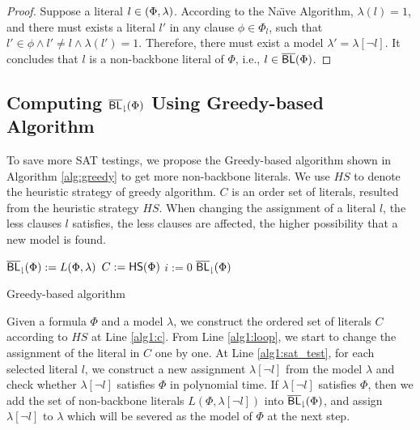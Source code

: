 \begin{proof}
Suppose a literal $l\in\relax(\Phi,\lambda)$. According to the Na\"{\i}ve Algorithm, $\lambda(l)=1$, and there must exists a literal $l'$ in any clause $\phi\in\Phi_l$, such that $l'\in\phi\wedge l'\neq l\wedge\lambda(l')=1$. Therefore, there must exist a model $\lambda'=\lambda[\neg l]$. It concludes that $l$ is a non-backbone literal of $\Phi$, i.e., $l\in\overline{\textsf{BL}}(\Phi)$.
\end{proof}

\medskip

\subsection{Computing ${\sf \overline{BL}_\downharpoonright}(\Phi)$ Using Greedy-based Algorithm}

To save more SAT testings, we propose the Greedy-based algorithm shown in Algorithm \ref{alg:greedy} to get more non-backbone literals. We use $HS$ to denote the heuristic strategy of greedy algorithm.
$C$ is an order set of literals, resulted from the heuristic strategy $HS$.
When changing the assignment of a literal $l$, the less clauses $l$ satisfies, the less clauses are affected, the higher possibility that a new model is found.

\begin{algorithm2e}
\SetAlgoShortEnd
\SetFillComment
{}
${\sf \overline{BL}_\downharpoonright}(\Phi):=L(\Phi,\lambda)$\; \label{alg1:init}
$C:={\sf HS}(\Phi)$\; \label{alg1:c}
$i:=0$\;
\Return ${\sf \overline{BL}_\downharpoonright}(\Phi)$\;
\caption{Greedy-based algorithm}
\label{alg:greedy}
\end{algorithm2e}
Given a formula $\Phi$ and a model $\lambda$, we construct the ordered set of literals $C$ according to $HS$ at Line \ref{alg1:c}. From Line \ref{alg1:loop}, we start to change the assignment of the literal in $C$ one by one. At Line \ref{alg1:sat_test}, for each selected literal $l$, we construct a new assignment $\lambda[\neg l]$ from the model
$\lambda$ and check whether  $\lambda[\neg l]$ satisfies $\Phi$ in polynomial time. If $\lambda[\neg l]$ satisfies $\Phi$, then we add the set of non-backbone literals $L(\Phi,\lambda[\neg l])$ into ${\sf \overline{BL}_\downharpoonright}(\Phi)$, and
assign $\lambda[\neg l]$ to $\lambda$ which will be severed as the model of $\Phi$ at the next step.


